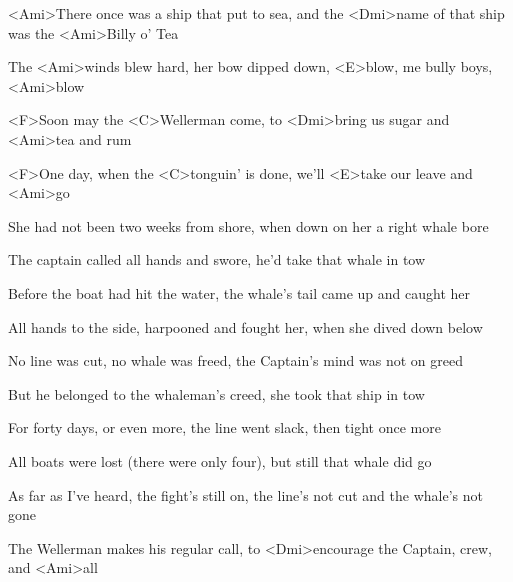 
\zs
<Ami>There once was a ship that put to sea, and the <Dmi>name of that ship was the <Ami>Billy o' Tea

The <Ami>winds blew hard, her bow dipped down, <E>blow, me bully boys, <Ami>blow
\ks

\zr
<F>Soon may the <C>Wellerman come, to <Dmi>bring us sugar and <Ami>tea and rum

<F>One day, when the <C>tonguin’ is done, we’ll <E>take our leave and <Ami>go
\kr

\zs
She had not been two weeks from shore, when down on her a right whale bore

The captain called all hands and swore, he'd take that whale in tow
\ks

\zr\kr

\zs
Before the boat had hit the water, the whale's tail came up and caught her

All hands to the side, harpooned and fought her, when she dived down below
\ks

\zr\kr

\zs
No line was cut, no whale was freed, the Captain's mind was not on greed

But he belonged to the whaleman's creed, she took that ship in tow
\ks

\zr\kr

\zs
For forty days, or even more, the line went slack, then tight once more

All boats were lost (there were only four), but still that whale did go
\ks

\zr\kr

\zs
As far as I've heard, the fight's still on, the line's not cut and the whale's not gone

The Wellerman makes his regular call, to <Dmi>encourage the Captain, crew, and <Ami>all
\ks

\zr\kr

\kp
